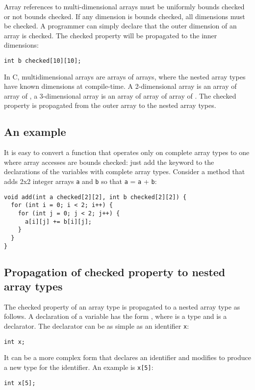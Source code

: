 Array references to multi-dimensional arrays must be uniformly bounds
checked or not bounds checked. If any dimension is bounds checked, all
dimensions must be checked. A programmer can simply declare that
the outer dimension of an array is checked.  The checked property will be
propagated to the inner dimensions:

\begin{lstlisting}
int b checked[10][10];
\end{lstlisting}

In C, multidimensional arrays are arrays of arrays,
where the nested array types have known dimensions at compile-time. A
2-dimensional array is an array of array of , a 3-dimensional array is
an array of array of array of . The checked property is propagated from the
outer array to the nested array types.

\subsection{An example}

It is easy to convert a function that operates only on complete array
types to one where array accesses are bounds checked: just add the
 keyword to the declarations of the variables with complete array
types. Consider a method that adds 2x2 integer arrays \lstinline+a+ and
\lstinline+b+ so that \lstinline+a+ = \lstinline+a+ + \lstinline+b+:

\begin{lstlisting}
void add(int a checked[2][2], int b checked[2][2]) {
  for (int i = 0; i < 2; i++) {
    for (int j = 0; j < 2; j++) {
      a[i][j] += b[i][j];
    }
  }
}
\end{lstlisting}

\subsection{Propagation of checked property to nested array types}
The checked property of an array type is propagated to a nested array type as follows.
A declaration of a variable has the form  ,
where  is a type and  is a declarator. The declarator
can be as simple as an identifier \lstinline+x+:
\begin{lstlisting}
int x;
\end{lstlisting}
It can be a more complex form that declares an identifier and modifies 
to produce a new type for the identifier. An example is \lstinline+x[5]+:
\begin{lstlisting}
int x[5];
\end{lstlisting}

